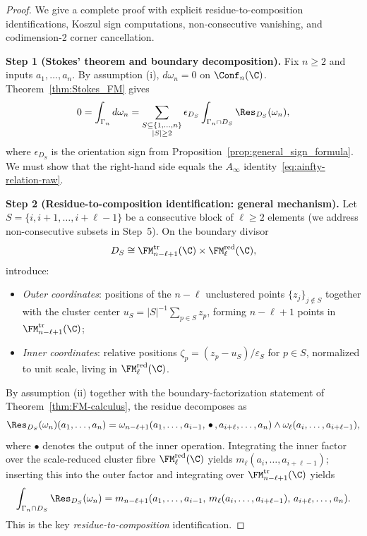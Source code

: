 \begin{proof}
We give a complete proof with explicit residue-to-composition identifications, Koszul sign computations, non-consecutive vanishing, and codimension-2 corner cancellation.

\medskip
\textbf{Step 1 (Stokes' theorem and boundary decomposition).}
Fix $n \geq 2$ and inputs $a_1,\ldots,a_n$. By assumption (i), $d\omega_n = 0$ on $\Conf_n(\C)$. Theorem~\ref{thm:Stokes_FM} gives
\begin{equation}
\label{eq:stokes-ainfty-master}
0 = \int_{\Gamma_n} d\omega_n = \sum_{\substack{S \subseteq \{1,\ldots,n\} \\ |S| \geq 2}} \epsilon_{D_S} \int_{\Gamma_n \cap D_S} \Res_{D_S}(\omega_n),
\end{equation}
where $\epsilon_{D_S}$ is the orientation sign from Proposition~\ref{prop:general_sign_formula}. We must show that the right-hand side equals the $A_\infty$ identity~\eqref{eq:ainfty-relation-raw}.

\medskip
\textbf{Step 2 (Residue-to-composition identification: general mechanism).}
Let $S = \{i, i{+}1, \ldots, i{+}\ell{-}1\}$ be a consecutive block of $\ell \geq 2$ elements (we address non-consecutive subsets in Step~5). On the boundary divisor
\[
D_S \cong \FM_{n-\ell+1}^{\mathrm{tr}}(\C)
\times \FM_\ell^{\mathrm{red}}(\C),
\]
introduce:
\begin{itemize}
\item \emph{Outer coordinates}: positions of the $n - \ell$ unclustered points $\{z_j\}_{j \notin S}$ together with the cluster center $u_S = |S|^{-1}\sum_{p \in S} z_p$, forming $n - \ell + 1$ points in $\FM_{n-\ell+1}^{\mathrm{tr}}(\C)$;
\item \emph{Inner coordinates}: relative positions $\zeta_p = (z_p - u_S)/\varepsilon_S$ for $p \in S$, normalized to unit scale, living in $\FM_\ell^{\mathrm{red}}(\C)$.
\end{itemize}
By assumption (ii) together with the boundary-factorization statement of
Theorem~\ref{thm:FM-calculus}, the residue decomposes as
\[
\Res_{D_S}(\omega_n)(a_1,\ldots,a_n) = \omega_{n-\ell+1}(a_1,\ldots,a_{i-1},\,\bullet\,,a_{i+\ell},\ldots,a_n) \wedge \omega_\ell(a_i,\ldots,a_{i+\ell-1}),
\]
where $\bullet$ denotes the output of the inner operation. Integrating
the inner factor over the scale-reduced cluster fibre
\(\FM_\ell^{\mathrm{red}}(\C)\) yields
\(m_\ell(a_i,\ldots,a_{i+\ell-1})\); inserting this into the outer
factor and integrating over
\(\FM_{n-\ell+1}^{\mathrm{tr}}(\C)\) yields
\[
\int_{\Gamma_n \cap D_S} \Res_{D_S}(\omega_n) = m_{n-\ell+1}(a_1,\ldots,a_{i-1},\, m_\ell(a_i,\ldots,a_{i+\ell-1}),\, a_{i+\ell},\ldots,a_n).
\]
This is the key \emph{residue-to-composition} identification.


\end{proof}
